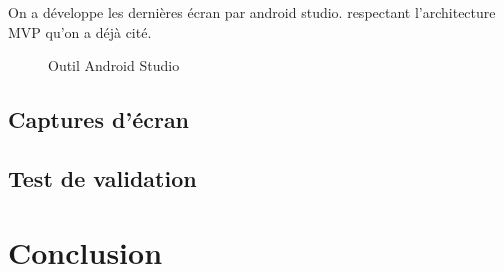 On a d\'eveloppe les derni\`eres \'ecran par android studio. respectant l'architecture \gls{MVP} qu'on a d\'ej\`a cit\'e.

\begin{figure}[H]
	\caption{\label{fig:my-label} Outil Android Studio}
\end{figure}

\subsection{Captures d'\'ecran}

\subsection{Test de validation}

\section{Conclusion}





